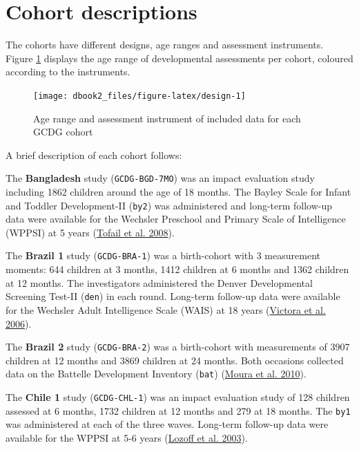 \documentclass[
]{book}
\begin{document}
\hypertarget{sec:cohorts}{%
\section{Cohort descriptions}\label{sec:cohorts}}

The cohorts have different designs, age ranges and assessment instruments. Figure \ref{fig:design} displays the age range of developmental assessments per cohort, coloured according to the instruments.

\begin{figure}

{\centering \texttt{[image: dbook2\_files/figure-latex/design-1]} 

}

\caption{Age range and assessment instrument of included data for each GCDG cohort}\label{fig:design}
\end{figure}



A brief description of each cohort follows:

The \textbf{Bangladesh} study (\texttt{GCDG-BGD-7MO}) was an impact evaluation study including 1862 children around the age of 18 months. The Bayley Scale for Infant and Toddler Development-II (\texttt{by2}) was administered and long-term follow-up data were available for the Wechsler Preschool and Primary Scale of Intelligence (WPPSI) at 5 years (\protect\hyperlink{ref-Tofail2008}{Tofail et al. 2008}).

The \textbf{Brazil 1} study (\texttt{GCDG-BRA-1}) was a birth-cohort with 3 measurement moments: 644 children at 3 months, 1412 children at 6 months and 1362 children at 12 months. The investigators administered the Denver Developmental Screening Test-II (\texttt{den}) in each round. Long-term follow-up data were available for the Wechsler Adult Intelligence Scale (WAIS) at 18 years (\protect\hyperlink{ref-Victora2006}{Victora et al. 2006}).

The \textbf{Brazil 2} study (\texttt{GCDG-BRA-2}) was a birth-cohort with measurements of 3907 children at 12 months and 3869 children at 24 months. Both occasions collected data on the Battelle Development Inventory (\texttt{bat}) (\protect\hyperlink{ref-Moura2010}{Moura et al. 2010}).

The \textbf{Chile 1} study (\texttt{GCDG-CHL-1}) was an impact evaluation study of 128 children assessed at 6 months, 1732 children at 12 months and 279 at 18 months. The \texttt{by1} was administered at each of the three waves. Long-term follow-up data were available for the WPPSI at 5-6 years (\protect\hyperlink{ref-Lozoff2003}{Lozoff et al. 2003}).
\end{document}
